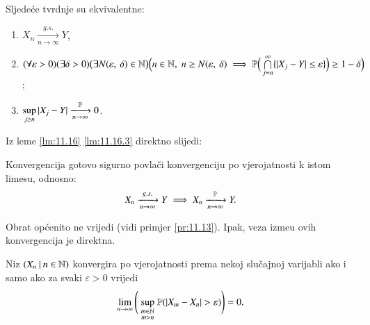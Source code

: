 \begin{lm}  \label{lm:11.16}
    Sljede\' ce tvrdnje su ekvivalentne:
    \begin{enumerate}[label=(\roman*)]
        \item $X_n \xrightarrow[n \to \infty]{g.s.} Y$,
        \item $(\forall \varepsilon > 0) (\exists \delta > 0 ) \big(\exists N ({\varepsilon}, \: {\delta}) \in \mathbb{N} \big)\\
        \Big(n \in \mathbb{N}, \; n \geq N ({\varepsilon}, \: {\delta}) \implies \mathbb{P} \Big( \bigcap\limits_{j = n}^{\infty} \{ |X_j - Y| \leq \varepsilon \} \Big) \geq 1 - \delta \Big)$;
        \item   \label{lm:11.16.3}
        $\sup\limits_{j \geq n} |X_j - Y| \xrightarrow[n  \to \infty]{\mathbb{P}} 0$.
    \end{enumerate}
\end{lm}
 Iz leme \ref{lm:11.16} \ref{lm:11.16.3} direktno slijedi:

\begin{kor}    \label{kor:11.17}
    Konvergencija gotovo sigurno povla\v ci konvergenciju po vjerojatnosti k istom limesu, odnosno:
    \begin{equation*}
        X_n \xrightarrow[n \to \infty]{g.s.} Y \implies X_n \xrightarrow[n \to \infty]{\mathbb{P}} Y.
    \end{equation*}
\end{kor}

Obrat op\' cenito ne vrijedi (vidi primjer \ref{pr:11.13}).
Ipak, veza izme\dj u ovih konvergencija je direktna.
 
\begin{lm} \label{lm:11.18}
    Niz $({X_n} \: | \: {n \in \mathbb{N}})$ konvergira po vjerojatnosti prema nekoj slu\v cajnoj varijabli ako i samo ako za svaki $\varepsilon > 0$ vrijedi
    \begin{equation*}
        \lim\limits_{n \to \infty} \Bigg( \sup\limits_{
            \begin{smallmatrix}
               m \in \mathbb{N}\\
               m > n
            \end{smallmatrix}
        }  \mathbb{P}({ |X_m - X_n| > \varepsilon })\Bigg) = 0.
    \end{equation*}
\end{lm}

